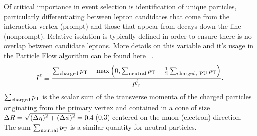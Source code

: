 Of critical importance in event selection is identification of unique particles, particularly differentiating between lepton candidates that come from the interaction vertex (prompt) and those that appear from decays down the line (nonprompt). Relative isolation is typically defined in order to ensure there is no overlap between candidate leptons. More details on this variable and it's usage in the Particle Flow algorithm can be found here  ~\cite{Sirunyan_2017}. 
\begin{equation}
I^{\ell} \equiv \frac{\sum_\text{charged}  p_{\mathrm{T}} + \max\left( 0, \sum_\text{neutral}  p_{\mathrm{T}}
                                         - \frac{1}{2} \sum_\text{charged, PU} p_{\mathrm{T}}  \right )}{p_{\mathrm{T}}^{\ell}}.
\label{eq:reconstruction_isolation}
\end{equation}
$\sum_\text{charged}  p_{\mathrm{T}}$ is the scalar sum of the
transverse momenta of the charged particles originating from
the primary vertex and contained in a cone of size
$\Delta R = \sqrt{\smash[b]{(\Delta \eta)^2 + (\Delta \phi)^2}} = 0.4$\,(0.3)
centered on the muon (electron) direction. The sum $\sum_\text{neutral}  p_{\mathrm{T}}$ is
a similar quantity for neutral particles.



